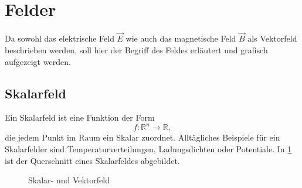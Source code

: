 %
%
%
%
\section{Felder\label{maxwell:mathFormulierung}}

Da sowohl das elektrische Feld $\vec{E}$ wie auch das magnetische Feld $\vec{B}$ als Vektorfeld beschrieben werden, soll hier der Begriff des Feldes erläutert und grafisch aufgezeigt werden.

\subsection{Skalarfeld\label{maxwell:skalarfeld}}

Ein Skalarfeld ist eine Funktion der Form
\[ f:\mathbb{R}^n \rightarrow \mathbb{R}, \] 
die jedem Punkt im Raum ein Skalar zuordnet.
Alltägliches Beispiele für ein Skalarfelder sind Temperaturverteilungen, Ladungsdichten oder Potentiale. In \ref{maxwell:skalarGrad} ist der Querschnitt eines Skalarfeldes abgebildet.



\begin{figure}
	\centering
	\caption{Skalar- und Vektorfeld}
	\label{maxwell:skalarGrad}
\end{figure}

